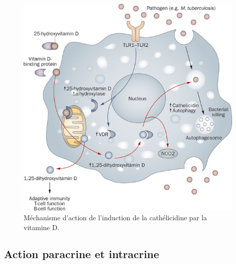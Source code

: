 \documentclass[
  a4paper,
  DIV=11,
  numbers=noendperiod,
  listof=totoc]{scrreprt}
\begin{document}
\begin{figure}

{\centering \includegraphics{figures/vd-mecha-cathelicidin.jpg}

}

\caption{Méchanisme d'action de l'induction de la cathélicidine par la
vitamine D.}

\end{figure}

\hypertarget{action-paracrine-et-intracrine}{%
\subsection{Action paracrine et
intracrine}\label{action-paracrine-et-intracrine}}
\end{document}
